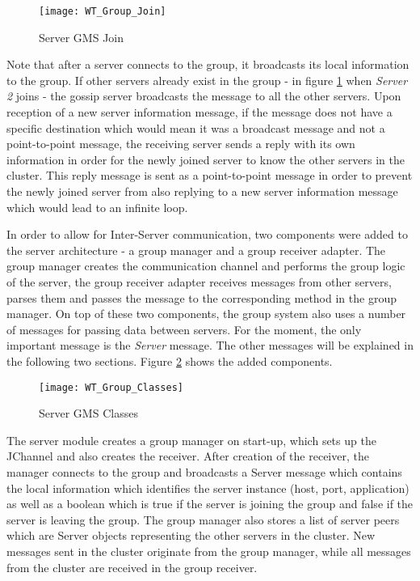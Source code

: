 \begin{figure}
	\centering
	\texttt{[image: WT\_Group\_Join]}
	\caption{Server GMS Join}
	\label{fig:groupjoin}
\end{figure}

Note that after a server connects to the group, it broadcasts its local information to the group. If other servers already exist in the group - in figure \ref{fig:groupjoin} when \textit{Server 2} joins - the gossip server broadcasts the message to all the other servers. Upon reception of a new server information message, if the message does not have a specific destination which would mean it was a broadcast message and not a point-to-point message, the receiving server sends a reply with its own information in order for the newly joined server to know the other servers in the cluster. This reply message is sent as a point-to-point message in order to prevent the newly joined server from also replying to a new server information message which would lead to an infinite loop.

In order to allow for Inter-Server communication, two components were added to the server architecture - a group manager and a group receiver adapter. The group manager creates the communication channel and performs the group logic of the server, the group receiver adapter receives messages from other servers, parses them and passes the message to the corresponding method in the group manager. On top of these two components, the group system also uses a number of messages for passing data between servers. For the moment, the only important message is the \textit{Server} message. The other messages will be explained in the following two sections. Figure \ref{fig:groupclasses} shows the added components.

\begin{figure}
	\centering
	\texttt{[image: WT\_Group\_Classes]}
	\caption{Server GMS Classes}
	\label{fig:groupclasses}
\end{figure}

The server module creates a group manager on start-up, which sets up the JChannel and also creates the receiver. After creation of the receiver, the manager connects to the group and broadcasts a Server message which contains the local information which identifies the server instance (host, port, application) as well as a boolean which is true if the server is joining the group and false if the server is leaving the group. The group manager also stores a list of server peers which are Server objects representing the other servers in the cluster. New messages sent in the cluster originate from the group manager, while all messages from the cluster are received in the group receiver.

